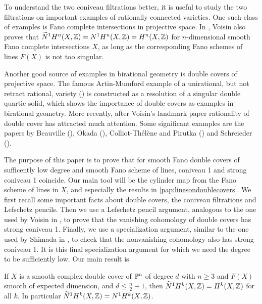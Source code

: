To understand the two coniveau filtrations better, it is useful to study the two filtrations on important examples of rationally connected varieties. One such class of examples is Fano complete intersections in projective space. In \cite{VoisinConiveauThreefolds}, Voisin also proves that $\widetilde{N}^1H^n(X,\Z) =  N^1H^n(X,\Z) = H^n(X,\Z)$ for $n$-dimensional smooth Fano complete intersections $X$, as long as the corresponding Fano schemes of lines $F(X)$ is not too singular.

Another good source of examples in birational geometry is double covers of projective space. The famous Artin-Mumford example of a unirational, but not retract rational, variety (\cite{ArtinMumford}) is constructed as a resolution of a singular double quartic solid, which shows the importance of double covers as examples in birational geometry. More recently, after Voisin's landmark paper \cite{VoisinUniversalCycle} rationality of double cover has attracted much attention. Some significant examples are the papers by Beauville (\cite{BeauvilleSextic}), Okada (\cite[Theorem 1.1]{OkadaCyclicCovers}), Colliot-Thélène and Pirutka (\cite{ColliotThelenePirutkaCyclicCovers}) and Schreieder (\cite[Theorem 9.1]{SchreiederHypersurface}).

The purpose of this paper is to prove that for smooth Fano double covers of sufficently low degree and smooth Fano scheme of lines, coniveau 1 and strong coniveau 1 coincide. Our main tool will be the cylinder map from the Fano scheme of lines in $X$, and especially the results in \cref{pap:linesondoublecovers}. We first recall some important facts about double covers, the coniveau filtrations and Lefschetz pencils. Then we use a Lefschetz pencil argument, analogous to the one used by Voisin in \cite[Theorem 1.13]{VoisinConiveauThreefolds}, to prove that the vanishing cohomology of double covers has strong coniveau 1. Finally, we use a specialization argument, similar to the one used by Shimada in \cite[Theorem 2-ii]{ShimadaHypersurfaces}, to check that the nonvanishing cohomology also has strong coniveau 1. It is this final specialization argument for which we need the degree to be sufficiently low. Our main result is
\begin{theorem}
   \label{thm:IntroductionCoincides}
    If $X$ is a smooth complex double cover of $\P^n$ of degree $d$ with $n \geq 3$ and $F(X)$ smooth of expected dimension, and $d \leq \frac{n}{2}+1$, then $\widetilde{N}^1H^k(X,\Z) = H^k(X,\Z)$ for all $k$. In particular $\widetilde{N}^1H^k(X,\Z) = N^1H^k(X,\Z)$.
\end{theorem}

